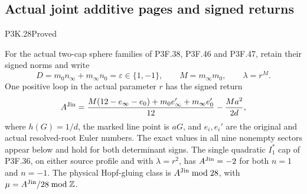 \subsection{Actual joint additive pages and signed returns}
\begin{statement}{P3K.28}{Proved}

For the actual two-cap sphere families of P3F.38, P3F.46 and P3F.47,
retain their signed norms and write
\[
 D=m_0n_\infty+m_\infty n_0=\varepsilon\in\{1,-1\},
 \qquad M=m_\infty m_0,\qquad \lambda=r^M .
\]
One positive loop in the actual parameter \(r\) has the signed return
\[
 A^{\rm Jin}
 =\frac{M(12-e_\infty-e_0)+m_0e_\infty'+m_\infty e_0'}{12}
       -\frac{Ma^2}{2d},
\]
where \(h(G)=1/d\), the marked line point is \(aG\), and
\(e_i,e_i'\) are the original and actual resolved-root Euler numbers.
The exact values in all nine nonempty sectors appear below and hold
for both determinant signs. The single quadratic \(I_1^*\) cap of
P3F.36, on either source profile and with \(\lambda=r^2\),
has \(A^{\rm Jin}=-2\) for both \(n=1\) and \(n=-1\).
The physical Hopf-gluing class is \(A^{\rm Jin}\bmod28\), with
\(\mu=A^{\rm Jin}/28\bmod\mathbb Z\).

\end{statement}

